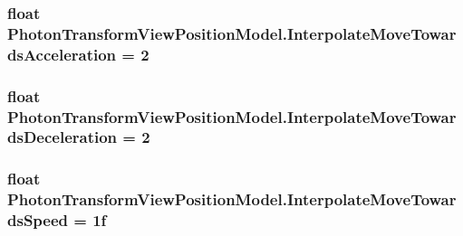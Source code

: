 \subsubsection[{\texorpdfstring{Interpolate\+Move\+Towards\+Acceleration}{InterpolateMoveTowardsAcceleration}}]{\setlength{\rightskip}{0pt plus 5cm}float Photon\+Transform\+View\+Position\+Model.\+Interpolate\+Move\+Towards\+Acceleration = 2}\hypertarget{class_photon_transform_view_position_model_a51965afc54a2e2cbaafb57e050555688}{}\label{class_photon_transform_view_position_model_a51965afc54a2e2cbaafb57e050555688}
\subsubsection[{\texorpdfstring{Interpolate\+Move\+Towards\+Deceleration}{InterpolateMoveTowardsDeceleration}}]{\setlength{\rightskip}{0pt plus 5cm}float Photon\+Transform\+View\+Position\+Model.\+Interpolate\+Move\+Towards\+Deceleration = 2}\hypertarget{class_photon_transform_view_position_model_a623f6bbf22e22073e9be25b84d98a11c}{}\label{class_photon_transform_view_position_model_a623f6bbf22e22073e9be25b84d98a11c}
\subsubsection[{\texorpdfstring{Interpolate\+Move\+Towards\+Speed}{InterpolateMoveTowardsSpeed}}]{\setlength{\rightskip}{0pt plus 5cm}float Photon\+Transform\+View\+Position\+Model.\+Interpolate\+Move\+Towards\+Speed = 1f}\hypertarget{class_photon_transform_view_position_model_aa0c899efb93f49d72d09f186cf0a61e0}{}\label{class_photon_transform_view_position_model_aa0c899efb93f49d72d09f186cf0a61e0}
